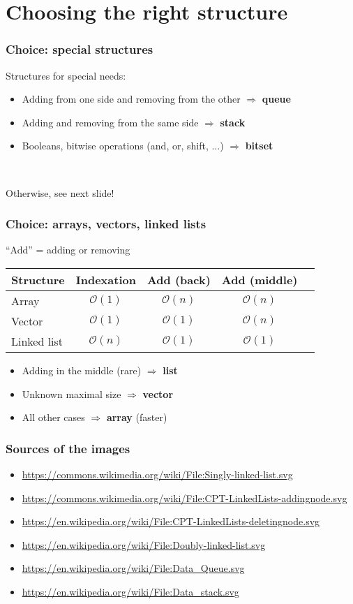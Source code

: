 \documentclass[12pt]{beamer}
\newcommand{\bigoh}[1]{\mathcal{O}\left(#1\right)}
\newcommand{\constant}{\bigoh{1}}
\newcommand{\linear}{\bigoh{n}}
\begin{document}
\section{Choosing the right structure}

\begin{frame}
\frametitle{Choice: special structures}
Structures for special needs:
\begin{itemize}
\item Adding from one side and removing from the other $\Rightarrow$ \textbf{queue}
\item Adding and removing from the same side $\Rightarrow$ \textbf{stack}
\item Booleans, bitwise operations (and, or, shift, ...) $\Rightarrow$ \textbf{bitset}
\end{itemize}

~

Otherwise, see next slide!
\end{frame}

\begin{frame}
\frametitle{Choice: arrays, vectors, linked lists}
``Add'' = adding or removing
\begin{center}
\begin{tabu}{l|cccc}
\toprule
Structure & Indexation & Add (back) & Add (middle) \\
\midrule
Array & $\constant$ & $\linear$ & $\linear$ \\
Vector & $\constant$ & $\constant$ & $\linear$ \\
Linked list & $\linear$ & $\constant$ & $\constant$ \\
\bottomrule
\end{tabu}
\end{center}
\begin{itemize}
\item Adding in the middle (rare) $\Rightarrow$ \textbf{list}
\item Unknown maximal size $\Rightarrow$ \textbf{vector}
\item All other cases $\Rightarrow$ \textbf{array} (faster)
\end{itemize}
\end{frame}

\begin{frame}
\frametitle{Sources of the images}
\begin{itemize}
\item \url{https://commons.wikimedia.org/wiki/File:Singly-linked-list.svg}
\item \url{https://commons.wikimedia.org/wiki/File:CPT-LinkedLists-addingnode.svg}
\item \url{https://en.wikipedia.org/wiki/File:CPT-LinkedLists-deletingnode.svg}
\item \url{https://en.wikipedia.org/wiki/File:Doubly-linked-list.svg}
\item \url{https://en.wikipedia.org/wiki/File:Data_Queue.svg}
\item \url{https://en.wikipedia.org/wiki/File:Data_stack.svg}
\end{itemize}
\end{frame}
\end{document}

